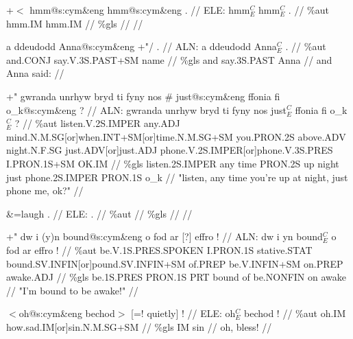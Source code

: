 \documentclass[a4paper,10pt]{article}
\begin{document}
\ex
\begingl[lingstyle=gergl]
\glchat +$<$ hmm@s:cym\&eng hmm@s:cym\&eng . //
\glsurface ELE:  hmm$^{C}_{E}$ hmm$^{C}_{E}$ .  //
\glauto \%aut  hmm{\scriptsize .IM} hmm{\scriptsize .IM}   //
\glmanual \%gls      //
\gleng  //
\endgl
\xe

\ex
\begingl[lingstyle=gergl]
\glchat a ddeudodd Anna@s:cym\&eng +"/ . //
\glsurface ALN:  a ddeudodd Anna$^{C}_{E}$ .  //
\glauto \%aut  and{\scriptsize .CONJ} say{\scriptsize .V.3S.PAST+SM} name   //
\glmanual \%gls  and say{\scriptsize .3S.PAST} Anna   //
\gleng and Anna said: //
\endgl
\xe

\ex
\begingl[lingstyle=gergl]
\glchat +" gwranda unrhyw bryd ti fyny nos \# just@s:cym\&eng ffonia fi o\_k@s:cym\&eng ? //
\glsurface ALN:  gwranda unrhyw bryd ti fyny nos just$^{C}_{E}$ ffonia fi o\_k$^{C}_{E}$ ?  //
\glauto \%aut  listen{\scriptsize .V.2S.IMPER} any{\scriptsize .ADJ} mind{\scriptsize .N.M.SG[or]when.INT+SM[or]time.N.M.SG+SM} you{\scriptsize .PRON.2S} above{\scriptsize .ADV} night{\scriptsize .N.F.SG} just{\scriptsize .ADV[or]just.ADJ} phone{\scriptsize .V.2S.IMPER[or]phone.V.3S.PRES} I{\scriptsize .PRON.1S+SM} OK{\scriptsize .IM}   //
\glmanual \%gls  listen{\scriptsize .2S.IMPER} any time PRON{\scriptsize .2S} up night just phone{\scriptsize .2S.IMPER} PRON{\scriptsize .1S} o\_k   //
\gleng "listen, any time you're up at night, just phone me, ok?" //
\endgl
\xe

\ex
\begingl[lingstyle=gergl]
\glchat \&=laugh . //
\glsurface ELE:  .  //
\glauto \%aut    //
\glmanual \%gls    //
\gleng  //
\endgl
\xe

\ex
\begingl[lingstyle=gergl]
\glchat +" dw i (y)n bound@s:cym\&eng o fod ar [?] effro ! //
\glsurface ALN:  dw i yn bound$^{C}_{E}$ o fod ar effro !  //
\glauto \%aut  be{\scriptsize .V.1S.PRES.SPOKEN} I{\scriptsize .PRON.1S} stative{\scriptsize .STAT} bound{\scriptsize .SV.INFIN[or]pound.SV.INFIN+SM} of{\scriptsize .PREP} be{\scriptsize .V.INFIN+SM} on{\scriptsize .PREP} awake{\scriptsize .ADJ}   //
\glmanual \%gls  be{\scriptsize .1S.PRES} PRON{\scriptsize .1S} PRT bound of be{\scriptsize .NONFIN} on awake   //
\gleng "I'm bound to be awake!" //
\endgl
\xe

\ex
\begingl[lingstyle=gergl]
\glchat $<$oh@s:cym\&eng bechod$>$ [=! quietly] ! //
\glsurface ELE:  oh$^{C}_{E}$ bechod !  //
\glauto \%aut  oh{\scriptsize .IM} how{\scriptsize .sad.IM[or]sin.N.M.SG+SM}   //
\glmanual \%gls  IM sin   //
\gleng oh, bless! //
\endgl
\xe
\end{document}
